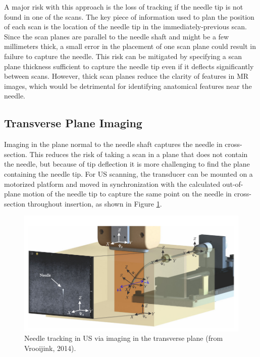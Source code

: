 A major risk with this approach is the loss of tracking if the needle tip is not found in one of the scans. The key piece of information used to plan the position of each scan is the location of the needle tip in the immediately-previous scan. Since the scan planes are parallel to the needle shaft and might be a few millimeters thick, a small error in the placement of one scan plane could result in failure to capture the needle. This risk can be mitigated by specifying a scan plane thickness sufficient to capture the needle tip even if it deflects significantly between scans. However, thick scan planes reduce the clarity of features in MR images, which would be detrimental for identifying anatomical features near the needle.


\subsection{Transverse Plane Imaging}
Imaging in the plane normal to the needle shaft captures the needle in cross-section. This reduces the risk of taking a scan in a plane that does not contain the needle, but because of tip deflection it is more challenging to find the plane containing the needle tip. For US scanning\cite{carriere_needle_2015,rossa_adaptive_2016,vrooijink_needle_2014}, the transducer can be mounted on a motorized platform and moved in synchronization with the calculated out-of-plane motion of the needle tip to capture the same point on the needle in cross-section throughout insertion, as shown in Figure \ref{fig:transverse_planes_us}.

\begin{figure}[h]
\includegraphics[width=1.0\textwidth]{Fig/chap2/vrooijink_US_tracking.png}
\caption{Needle tracking in US via imaging in the transverse plane (from Vrooijink, 2014).}
\label{fig:transverse_planes_us}
\end{figure}

